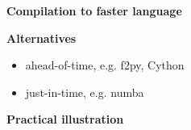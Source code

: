 \begin{frame}\begin{center}
		\LARGE\textbf{Compilation to faster language}
\end{center}\end{frame}
\begin{frame}\textbf{Alternatives}\vspace{0.3cm}

	\begin{itemize}\setlength\itemsep{1em}
			\item ahead-of-time, e.g. f2py, Cython
			\item just-in-time, e.g. numba
	\end{itemize}
\end{frame}
\begin{frame}\textbf{Practical illustration}\vspace{0.3cm}
  	\begin{figure}[htp]\centering
  	\end{figure}
\end{frame}
